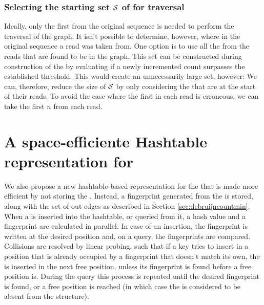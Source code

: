 \subsubsection{Selecting the starting set $\strsetname{S}$ of  for traversal}

Ideally, only the first \kmer from the original sequence is  needed to perform the traversal of the graph. It isn't possible to determine, however, where in the original sequence a read was taken from. One option is to use all the  from the reads that are found to be in the graph. This set can be constructed during construction of the \dBCM by evaluating if a newly incremented  count surpasses the established threshold. This would create an unnecessarily large set, however:  We can, therefore, reduce the size of $\strsetname{S}$ by only considering the  that are at the start of their reads. To avoid the case where the first \kmer in each read is erroneous, we can take the first $n$  from each read. 

\section{A space-efficiente Hashtable representation for }
\label{sec:debruijnhashtable}

We also propose a new hashtable-based representation for the \dBG that is made more efficient by not storing the \kmer. Instead,
a fingerprint generated from the \kmer is stored, along with the set of out edges as described in Section \ref{sec:debruijncountmin}.
When a \kmer is inserted into the hashtable, or queried from it, a hash value and a fingerprint are calculated in parallel.
In case of an insertion, the fingerprint is written at the desired position and, on a query, the fingerprints are compared. Collisions
are resolved by linear probing, such that if a key tries to insert in a position that is already occupied by a fingerprint that doesn't 
match its own, the \kmer is inserted in the next free position, unless its fingerprint is found before a free position is. During the
query this process is repeated until the desired fingerprint is found, or a free position is reached (in which case the \kmer is
considered to be absent from the structure).

